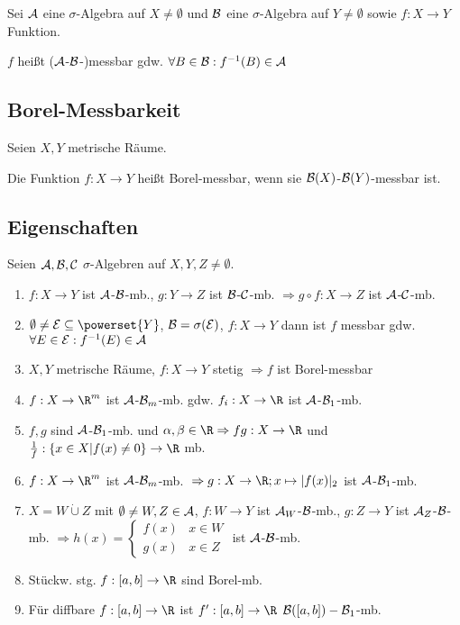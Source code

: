 Sei $\mathcal{A}$ eine $\sigma$-Algebra auf $X \neq \emptyset$ und $\mathcal{B}$ eine $\sigma$-Algebra auf $Y \neq \emptyset$ sowie $f : X \to Y$ Funktion.

$f$ heißt ($\mathcal{A}$-$\mathcal{B}$-)messbar gdw. $\forall B \in \mathcal{B} : f^{-1}(B) \in \mathcal{A}$

\subsection*{Borel-Messbarkeit}

Seien $X, Y$ metrische Räume.

Die Funktion $f : X \to Y$ heißt Borel-messbar, wenn sie $\mathcal{B}(X)$-$\mathcal{B}(Y)$-messbar ist.

\subsection*{Eigenschaften}

Seien $\mathcal{A}, \mathcal{B}, \mathcal{C}$ $\sigma$-Algebren auf $X, Y, Z \neq \emptyset$.

\begin{enumerate}[label=(\alph*)]
	\item $f : X \to Y$ ist $\mathcal{A}$-$\mathcal{B}$-mb., $g : Y \to Z$ ist $\mathcal{B}$-$\mathcal{C}$-mb. $\Rightarrow g \circ f : X \to Z$ ist $\mathcal{A}$-$\mathcal{C}$-mb.
	\item $\emptyset \neq \E \subseteq \powerset{Y}$, $\mathcal{B} = \sigma(\mathcal{E})$, $f: X \to Y$ dann ist $f$ messbar gdw. $\forall E \in \mathcal{E} : f^{-1}(E) \in \mathcal{A}$
	\item $X, Y$ metrische Räume, $f : X \to Y$ stetig $\Rightarrow f$ ist Borel-messbar
	\item $f : X \to \R^m$ ist $\mathcal{A}$-$\mathcal{B}_m$-mb. gdw. $f_i : X \to \R$ ist $\mathcal{A}$-$\mathcal{B}_1$-mb.
	\item $f, g$ sind $\mathcal{A}$-$\mathcal{B}_1$-mb. und $\alpha, \beta \in \R \Rightarrow fg : X \to \R$ und $\frac{1}{f} : \{x \in X | f(x) \neq 0\} \to \R$ mb.
	\item $f : X \to \R^m$ ist $\mathcal{A}$-$\mathcal{B}_m$-mb. $\\\Rightarrow g : X \to \R; x \mapsto |f(x)|_2$ ist $\mathcal{A}$-$\mathcal{B}_1$-mb.
	\item{
		$X = W \dot\cup Z$ mit $\emptyset \neq W, Z \in \mathcal{A}$, $f : W \to Y$ ist $\mathcal{A}_W$-$\mathcal{B}$-mb., $g : Z \to Y$ ist $\mathcal{A}_Z$-$\mathcal{B}$-mb. $\Rightarrow h(x) = \begin{cases}
			f(x) & x \in W \\
			g(x) & x \in Z
		\end{cases}$ ist $\mathcal{A}$-$\mathcal{B}$-mb.
	}
	\item Stückw. stg. $f: [a,b] \to \R$ sind Borel-mb.
	\item Für diffbare $f : [a,b] \to \R$ ist $f' : [a,b] \to \R$ $\mathcal{B}([a,b])-\mathcal{B}_1$-mb.
\end{enumerate}

